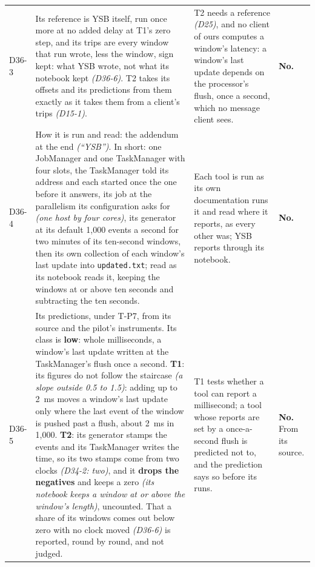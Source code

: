 \documentclass[11pt]{article}
\newcommand{\gl}[1]{{\color{soft}\itshape\small (#1)}}
\begin{document}
{\begin{longtable}{@{}p{1.1cm} >{\raggedright\arraybackslash}p{6.1cm} >{\raggedright\arraybackslash}p{6.0cm} >{\raggedright\arraybackslash}p{2.2cm}@{}}
D36-3 & Its reference is YSB itself, run once more at no added delay at T1's zero step, and its trips are every window that run wrote, less the window, sign kept: what YSB wrote, not what its notebook kept \gl{D36-6}. T2 takes its offsets and its predictions from them exactly as it takes them from a client's trips \gl{D15-1}. & T2 needs a reference \gl{D25}, and no client of ours computes a window's latency: a window's last update depends on the processor's flush, once a second, which no message client sees. & \textbf{No.} \\
D36-4 & How it is run and read: the addendum at the end \gl{``YSB''}. In short: one JobManager and one TaskManager with four slots, the TaskManager told its address and each started once the one before it answers, its job at the parallelism its configuration asks for \gl{one host by four cores}, its generator at its default 1,000 events a second for two minutes of its ten-second windows, then its own collection of each window's last update into \texttt{updated.txt}; read as its notebook reads it, keeping the windows at or above ten seconds and subtracting the ten seconds. & Each tool is run as its own documentation runs it and read where it reports, as every other was; YSB reports through its notebook. & \textbf{No.} \\
D36-5 & Its predictions, under T-P7, from its source and the pilot's instruments. Its class is \textbf{low}: whole milliseconds, a window's last update written at the TaskManager's flush once a second. \textbf{T1}: its figures do not follow the staircase \gl{a slope outside 0.5 to 1.5}: adding up to 2~ms moves a window's last update only where the last event of the window is pushed past a flush, about 2~ms in 1,000. \textbf{T2}: its generator stamps the events and its TaskManager writes the time, so its two stamps come from two clocks \gl{D34-2: two}, and it \textbf{drops the negatives} and keeps a zero \gl{its notebook keeps a window at or above the window's length}, uncounted. That a share of its windows comes out below zero with no clock moved \gl{D36-6} is reported, round by round, and not judged. & T1 tests whether a tool can report a millisecond; a tool whose reports are set by a once-a-second flush is predicted not to, and the prediction says so before its runs. & \textbf{No.} From its source. \\

\end{longtable}}
\end{document}
